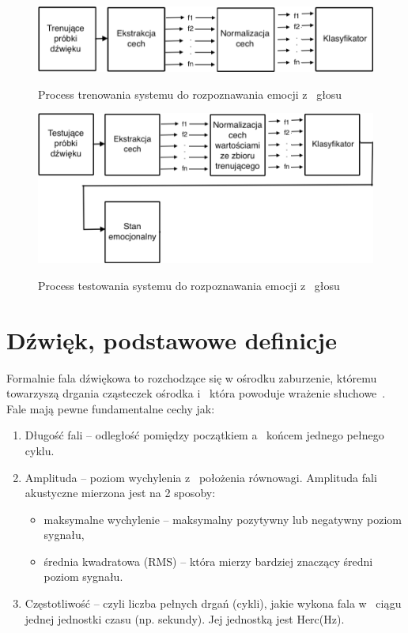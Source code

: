 \documentclass[declaration,shortabstract]{iithesis}
\begin{document}
\begin{figure}[!htb]
\hspace*{-6cm}
	\caption{Process trenowania systemu do rozpoznawania emocji z~ głosu}
	\includegraphics[scale=0.40]{trenowanie.png}
\label{ser_tren}
\end{figure}

\begin{figure}[!htb]
\hspace*{-6cm}  
	\caption{Process testowania systemu do rozpoznawania emocji z~ głosu}
	\includegraphics[scale=0.35]{testowanie.png}
\label{ser_test}
\end{figure}

\section{Dźwięk, podstawowe definicje}
Formalnie fala dźwiękowa to rozchodzące się w ośrodku zaburzenie, któremu towarzyszą drgania cząsteczek ośrodka i~ która powoduje wrażenie słuchowe~\cite{Akustyka}. Fale mają pewne fundamentalne cechy jak:
\begin{enumerate}
\item Długość fali -- odległość pomiędzy początkiem a~ końcem jednego pełnego cyklu.
\item Amplituda -- poziom wychylenia z~ położenia równowagi. Amplituda fali akustyczne mierzona jest na 2 sposoby:
	\begin{itemize}
	\item maksymalne wychylenie -- maksymalny pozytywny lub negatywny poziom sygnału,
	\item średnia kwadratowa (RMS) -- która mierzy bardziej znaczący średni poziom sygnału.
	\end{itemize}
\item Częstotliwość -- czyli liczba pełnych drgań (cykli), jakie wykona fala w~ ciągu jednej jednostki czasu (np. sekundy). Jej jednostką jest Herc(Hz).
\end{enumerate}
\end{document}
